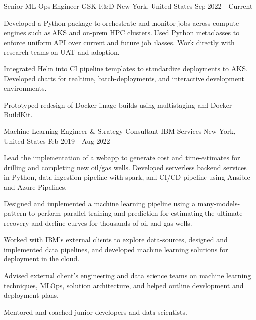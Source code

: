 

\begin{cventries}

\cventry
  {Senior ML Ops Engineer} %
  {GSK R\&D}
  {New York, United States} %
  {Sep 2022 - Current} %
  {
    \begin{cvitems} %
      \item { Developed a Python package to orchestrate and monitor jobs across compute engines such as AKS and on-prem HPC clusters. Used Python metaclasses to enforce uniform API over current and future job classes. Work directly with research teams on UAT and adoption. }
      \item { Integrated Helm into CI pipeline templates to standardize deployments to AKS. Developed charts for realtime, batch-deployments, and interactive development environments. }
      \item { Prototyped redesign of Docker image builds using multistaging and Docker BuildKit. }
    \end{cvitems}
  }
  \cventry
    {Machine Learning Engineer \& Strategy Consultant} %
    {IBM Services}
    {New York, United States} %
    {Feb 2019 - Aug 2022} %
    {
      \begin{cvitems} %
        \item {Lead the implementation of a webapp to generate cost and time-estimates for drilling and completing new oil/gas wells. Developed serverless backend services in Python, data ingestion pipeline with spark, and CI/CD pipeline using Ansible and Azure Pipelines.}
        \item {Designed and implemented a machine learning pipeline using a many-models-pattern to perform parallel training and prediction for estimating the ultimate recovery and decline curves for thousands of oil and gas wells.}
        \item {Worked with IBM's external clients to explore data-sources, designed and implemented data pipelines, and developed machine learning solutions for deployment in the cloud.}
        \item {Advised external client's engineering and data science teams on machine learning techniques, MLOps, solution architecture, and helped outline development and deployment plans.}
        \item {Mentored and coached junior developers and data scientists.}
      \end{cvitems}
    }


\end{cventries}
